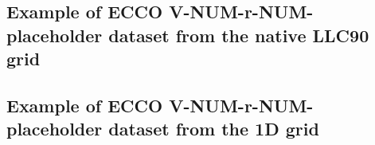 \subsection{Example of ECCO V-NUM-r-NUM-placeholder dataset from the native LLC90 grid}

\pagebreak
\subsection{Example of ECCO V-NUM-r-NUM-placeholder dataset from the 1D grid}


